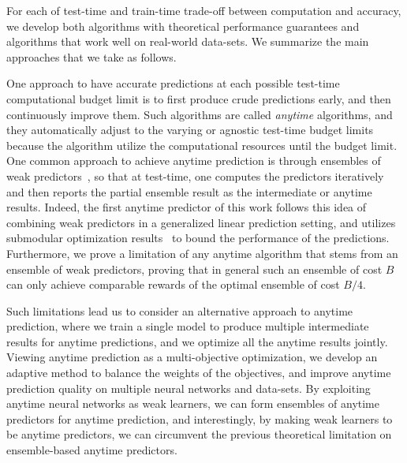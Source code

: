 For each of test-time and train-time trade-off between computation and accuracy, we develop both algorithms with theoretical performance guarantees and algorithms that work well on real-world data-sets. We summarize the main approaches that we take as follows. 

One approach to have accurate predictions at each possible test-time computational budget limit is to first produce crude predictions early, and then continuously improve them. Such algorithms are called \emph{anytime} algorithms, and they automatically adjust to the varying or agnostic test-time budget limits because the algorithm utilize the computational resources until the budget limit. 
One common approach to achieve anytime prediction is through ensembles of weak predictors~\citep{sochman:05,brubaker:07,lefakis:10,reyzin:11,xu:14,cai:15,speedboost}, so that at test-time, one computes the predictors iteratively and then reports the partial ensemble result as the intermediate or anytime results. Indeed, the first anytime predictor of this work follows this idea of combining weak predictors in a generalized linear prediction setting, and utilizes submodular optimization results~\citep{kemp} to bound the performance of the predictions. Furthermore, we prove a limitation of any anytime algorithm that stems from an ensemble of weak predictors, proving that in general such an ensemble of cost $B$ can only achieve comparable rewards of the optimal ensemble of cost $B/4$. 

Such limitations lead us to consider an alternative approach to anytime prediction, where we train a single model to produce multiple intermediate results for anytime predictions, and we optimize all the anytime results jointly. 
Viewing anytime prediction as a multi-objective optimization, we develop an adaptive method to balance the weights of the objectives, and improve anytime prediction quality on multiple neural networks and data-sets. 
By exploiting anytime neural networks as weak learners, we can form ensembles of anytime predictors for anytime prediction, and interestingly, by making weak learners to be anytime predictors, we can circumvent the previous theoretical limitation on ensemble-based anytime predictors.

